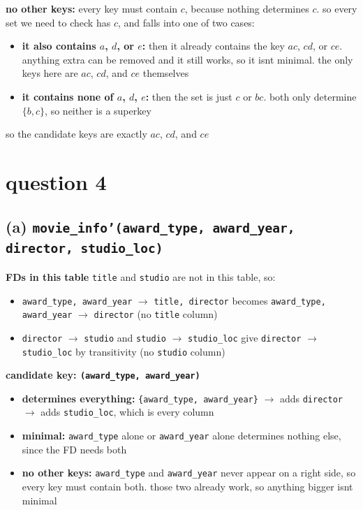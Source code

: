 \documentclass[11pt]{article}
\newcommand{\at}[1]{\texttt{#1}}
\begin{document}
\noindent\textbf{no other keys:} every key must contain $c$, because nothing
determines $c$. so every set we need to check has $c$, and falls into one of
two cases:
\begin{itemize}
  \item \textbf{it also contains $a$, $d$, or $e$:} then it already contains
    the key $ac$, $cd$, or $ce$. anything extra can be removed and it still
    works, so it isnt minimal. the only keys here are $ac$, $cd$, and $ce$
    themselves
  \item \textbf{it contains none of $a$, $d$, $e$:} then the set is just $c$
    or $bc$. both only determine $\{b,c\}$, so neither is a superkey
\end{itemize}
so the candidate keys are exactly $ac$, $cd$, and
$ce$

\section*{question 4}

\subsection*{(a) \at{movie\_info'(award\_type, award\_year, director, studio\_loc)}}

\noindent\textbf{FDs in this table} \at{title} and \at{studio} are not in
this table, so:
\begin{itemize}
  \item \at{award\_type, award\_year} $\to$ \at{title, director} becomes
    \at{award\_type, award\_year} $\to$ \at{director} (no \at{title} column)
  \item \at{director} $\to$ \at{studio} and \at{studio} $\to$
    \at{studio\_loc} give \at{director} $\to$ \at{studio\_loc} by
    transitivity (no \at{studio} column)
\end{itemize}

\noindent\textbf{candidate key: \at{(award\_type, award\_year)}}
\begin{itemize}
  \item \textbf{determines everything:} \at{\{award\_type, award\_year\}}
    $\to$ adds \at{director} $\to$ adds \at{studio\_loc}, which is every
    column
  \item \textbf{minimal:} \at{award\_type} alone or \at{award\_year} alone
    determines nothing else, since the FD needs both
  \item \textbf{no other keys:} \at{award\_type} and \at{award\_year} never
    appear on a right side, so every key must contain both. those two
    already work, so anything bigger isnt minimal
\end{itemize}
\end{document}
